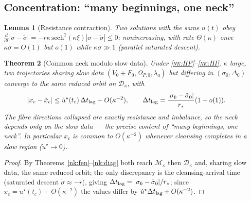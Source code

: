 \documentclass[11pt,a4paper]{article}
\theoremstyle{plain}
\newtheorem{theorem}{Theorem}[section]
\newtheorem{lemma}[theorem]{Lemma}
\theoremstyle{definition}
\theoremstyle{remark}
\newcommand{\Mk}{\mathcal M_\kappa}
\newcommand{\Dk}{\mathcal D_\kappa}
\begin{document}
\subsection*{Concentration: ``many beginnings, one neck''}
\begin{lemma}[Resistance contraction]\label{nk:contract}
Two solutions with the same \(u(t)\) obey \(\tfrac{d}{dt}|\sigma-\tilde\sigma|=-r\kappa\,
\mathrm{sech}^2(\kappa\xi)|\sigma-\tilde\sigma|\le0\): nonincreasing, with rate \(\Theta(\kappa)\) once
\(\kappa\sigma=O(1)\) but \(o(1)\) while \(\kappa\sigma\gg1\) (parallel saturated descent).
\end{lemma}
\begin{theorem}[Common neck modulo slow data]\label{nk:common}
Under \textsc{\ref{nk:HP}--\ref{nk:HI}}, \(\kappa\) large, two trajectories sharing slow data
\((V_0+F_0,\Omega_{P,0},\lambda_0)\) but differing in \((\sigma_0,\Delta_0)\) converge to the same
reduced orbit on \(\Dk\), with
\[
|x_c-\tilde x_c|\le \dot u^\star(t_c)\,\Delta t_{\rm lag}+O(\kappa^{-2}),\qquad
\Delta t_{\rm lag}=\frac{|\sigma_0-\tilde\sigma_0|}{r_*}(1+o(1)).
\]
The fibre directions collapsed are exactly resistance and imbalance, so the neck depends only on the
slow data --- the precise content of ``many beginnings, one neck''. In particular \(x_c\) is common
to \(O(\kappa^{-2})\) whenever cleansing completes in a slow region (\(\dot u^\star\to0\)).
\end{theorem}
\begin{proof}
By Theorems~\ref{nk:fen}--\ref{nk:diag} both reach \(\Mk\) then \(\Dk\) and, sharing slow data, the
same reduced orbit; the only discrepancy is the cleansing-arrival time (saturated descent
\(\dot\sigma\approx-r\)), giving \(\Delta t_{\rm lag}=|\sigma_0-\tilde\sigma_0|/r_*\); since
\(x_c=u^\star(t_c)+O(\kappa^{-2})\) the values differ by \(\dot u^\star\Delta t_{\rm lag}+O(\kappa^{-2})\).
\end{proof}
\end{document}
